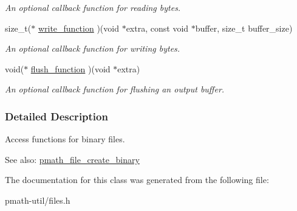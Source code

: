 \begin{CompactItemize}
\begin{CompactList}\small\item\em An optional callback function for reading bytes. \item\end{CompactList}\item 
\hypertarget{structpmath__binary__file__api__t_7445768eba204b0afbbf6e5002339e63}{
size\_\-t($\ast$ \hyperlink{structpmath__binary__file__api__t_7445768eba204b0afbbf6e5002339e63}{write\_\-function} )(void $\ast$extra, const void $\ast$buffer, size\_\-t buffer\_\-size)}
\label{structpmath__binary__file__api__t_7445768eba204b0afbbf6e5002339e63}

\begin{CompactList}\small\item\em An optional callback function for writing bytes. \item\end{CompactList}\item 
\hypertarget{structpmath__binary__file__api__t_36e555e1ceec193b42ea3ba76e2c9b43}{
void($\ast$ \hyperlink{structpmath__binary__file__api__t_36e555e1ceec193b42ea3ba76e2c9b43}{flush\_\-function} )(void $\ast$extra)}
\label{structpmath__binary__file__api__t_36e555e1ceec193b42ea3ba76e2c9b43}

\begin{CompactList}\small\item\em An optional callback function for flushing an output buffer. \item\end{CompactList}\end{CompactItemize}


\subsubsection{Detailed Description}
Access functions for binary files. 

\begin{Desc}
\item[See also:]\hyperlink{group__file__api_g121e1c31d32fa30b60c8bb4d0808f4eb}{pmath\_\-file\_\-create\_\-binary} \end{Desc}


The documentation for this class was generated from the following file:\begin{CompactItemize}
\item 
pmath-util/files.h\end{CompactItemize}
